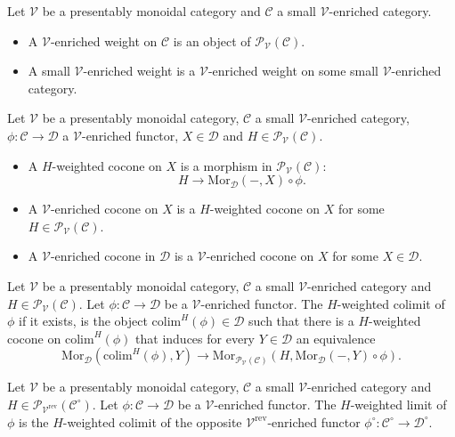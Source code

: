 \documentclass[10pt,oneside]{article}
\numberwithin{equation}{section} %
\numberwithin{figure}{section} %
\theoremstyle{plain}
\theoremstyle{definition}
\newcommand{\mC}{{\mathcal C}}
\newcommand{\mD}{{\mathcal D}}
\newcommand{\mP}{{\mathcal P}}
\newcommand{\mV}{{\mathcal V}}
\newcommand{\colim}{\mathrm{colim}}
\newcommand{\rev}{{\mathrm{rev}}}
\newcommand{\Mor}{{\mathrm{Mor}}}
\begin{document}
\begin{definition}
Let $\mV$ be a presentably monoidal category and $\mC$ a small $\mV$-enriched category.

\begin{itemize}
\item 
A $\mV$-enriched weight on $\mC$ is an object of $ \mP_\mV(\mC)$.

\item A small $\mV$-enriched weight is a $\mV$-enriched weight on some small $\mV$-enriched category.

\end{itemize}

\end{definition}

\begin{definition}
Let $\mV$ be a presentably monoidal category, $\mC$ a small $\mV$-enriched category, $\phi: \mC \to \mD$ a $\mV$-enriched functor, $X \in \mD$ and $H \in \mP_\mV(\mC).$

\begin{itemize}

\item A $H$-weighted cocone on $X$ is a morphism in $\mP_\mV(\mC):$
$$ H \to \Mor_\mD(-,X) \circ \phi. $$

\item A $\mV$-enriched cocone on $X$ is a $H$-weighted cocone on $X$ for some $H \in \mP_\mV(\mC).$

\item A $\mV$-enriched cocone in $\mD$ is a $\mV$-enriched cocone on $X$ for some $X \in \mD.$

\end{itemize}

\end{definition}

\begin{definition}
Let $\mV$ be a presentably monoidal category, $\mC$ a small $\mV$-enriched category and $H \in \mP_\mV(\mC).$ 
Let $\phi: \mC \to \mD$ be a $\mV$-enriched functor.
The $H$-weighted colimit of $\phi$ if it exists, is the object 
$\colim^H(\phi) \in \mD$ such that there is a $H$-weighted cocone on $\colim^H(\phi)$ that induces for every $Y \in \mD$ an equivalence
$$ \Mor_{\mD}(\colim^H(\phi),Y) \to \Mor_{\mP_\mV(\mC)}(H, \Mor_\mD(-,Y) \circ \phi).$$

\end{definition}

\begin{definition}
Let $\mV$ be a presentably monoidal category, $\mC$ a small $\mV$-enriched category and $H \in \mP_{\mV^\rev}(\mC^\circ).$ 
Let $\phi: \mC \to \mD $ be a $\mV$-enriched functor.
The $H$-weighted limit of $\phi$ is the $H$-weighted colimit of the opposite $\mV^\rev$-enriched functor $\phi^\circ : \mC^\circ \to \mD^\circ. $

\end{definition}
\end{document}
